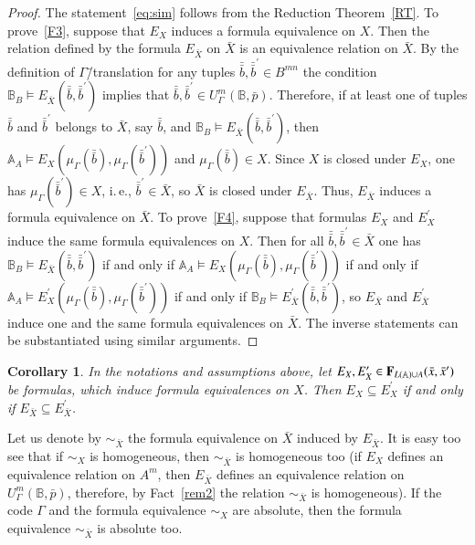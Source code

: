 \documentclass[12pt]{article}
\newtheorem{corollary}{Corollary}
\theoremstyle{definition}
\def\MA{{\mathbb{A}}}
\def\MB{{\mathbb{B}}}
\begin{document}
\begin{proof}
The statement~\eqref{eq:sim} follows from the Reduction Theorem~\ref{RT}. To prove~\ref{F3}, suppose that $E_X$ induces a formula equivalence on $X$. Then the relation defined by the formula $E_{\bar X}$ on $\bar X$ is an equivalence relation on $\bar X$. By the definition of $\Gamma$\=/translation for any tuples $\bar {\bar b}, \bar {\bar b }^\prime\in B^{mn}$ the condition $\MB_B\models E_{\bar X}(\bar {\bar b},\bar {\bar b}^\prime)$ implies that $\bar {\bar b}, \bar {\bar b}^\prime\in U^m_\Gamma(\MB,\bar p)$. Therefore, if at least one of tuples $\bar {\bar b}$ and $\bar {\bar b}^\prime$ belongs to $\bar X$, say $\bar {\bar b}$, and $\MB_B\models E_{\bar X}(\bar {\bar b},\bar {\bar b}^\prime)$, then $\MA_A\models E_X(\mu_\Gamma(\bar {\bar b}),\mu_\Gamma(\bar {\bar b}^\prime))$ and $\mu_\Gamma(\bar {\bar b})\in X$. Since $X$ is closed under $E_X$, one has $\mu_\Gamma(\bar {\bar b}^\prime)\in X$, i.\,e., $\bar {\bar b}^\prime\in \bar X$, so $\bar X$ is closed under $E_{\bar X}$. Thus, $E_{\bar X}$ induces a formula equivalence on $\bar X$. To prove~\ref{F4}, suppose that formulas $E_X$ and $E^\prime_X$ induce the same formula equivalences on $X$. Then for all $\bar {\bar b},\bar {\bar b}^\prime\in \bar X$ one has $\MB_B\models E_{\bar X}(\bar {\bar b},\bar {\bar b}^\prime)$ if and only if $\MA_A\models E_X(\mu_\Gamma(\bar {\bar b}),\mu_\Gamma(\bar {\bar b}^\prime))$ if and only if $\MA_A\models E^\prime_X(\mu_\Gamma(\bar {\bar b}),\mu_\Gamma(\bar {\bar b}^\prime))$ if and only if $\MB_B\models E^\prime_{\bar X}(\bar {\bar b},\bar {\bar b}^\prime)$, so $E_{\bar X}$ and $E^\prime_{\bar X}$ induce one and the same formula equivalences on $\bar X$. The inverse statements can be substantiated using similar arguments. 
\end{proof}

\begin{corollary}\label{cor:nat_sur}
In the notations and assumptions above, let $E_X,E^\prime_X\in {\bf F}_{L(\MA)\cup A}(\bar x,\bar x^\prime)$ be formulas, which induce formula equivalences on $X$. Then $E_X\subseteq E^\prime_X$ if and only if $E_{\bar X}\subseteq E^\prime_{\bar X}$.
\end{corollary}

Let us denote by $\sim_{\bar X}$ the formula equivalence on $\bar X$ induced by $E_{\bar X}$. It is easy too see that if $\sim_X$ is homogeneous, then $\sim_{\bar X}$ is homogeneous too (if $E_X$ defines an equivalence relation on $A^m$, then $E_{\bar{X}}$ defines an equivalence relation on $U^m_\Gamma(\MB,\bar p)$, therefore, by Fact~\ref{rem2} the relation $\sim_{\bar X}$ is homogeneous). If the code $\Gamma$ and the formula equivalence $\sim_X$ are absolute, then the formula equivalence $\sim_{\bar X}$ is absolute too. 
\end{document}
